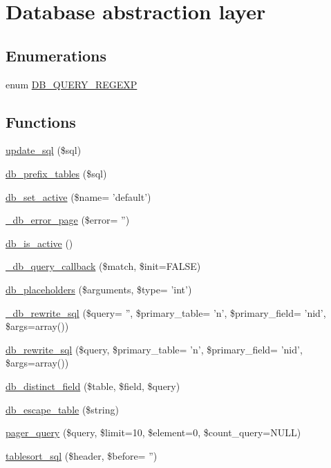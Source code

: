 \hypertarget{group__database}{
\section{Database abstraction layer}
\label{group__database}
}
\subsection*{Enumerations}
\begin{CompactItemize}
\item 
enum \hyperlink{group__database_gac2405479299ce848b4c294cdba9b046}{DB\_\-QUERY\_\-REGEXP} 
\end{CompactItemize}
\subsection*{Functions}
\begin{CompactItemize}
\item 
\hyperlink{group__database_g67680310ffaf72da52a9c2453325c0fb}{update\_\-sql} (\$sql)
\item 
\hyperlink{group__database_gdb274339376ae7e48e3ea4da4c1de0b1}{db\_\-prefix\_\-tables} (\$sql)
\item 
\hyperlink{group__database_g84e68f6dbf9cdec826e7b3852d1b283c}{db\_\-set\_\-active} (\$name= 'default')
\item 
\hyperlink{group__database_g5aab9d68ecdc1712369d5d1ef64d455c}{\_\-db\_\-error\_\-page} (\$error= '')
\item 
\hyperlink{group__database_g19eaaae8681bb72e7476ef0aa0a5d01f}{db\_\-is\_\-active} ()
\item 
\hyperlink{group__database_g337493a6287b3b48a5a2ba6d74e844bf}{\_\-db\_\-query\_\-callback} (\$match, \$init=FALSE)
\item 
\hyperlink{group__database_g8d4c967b43af1b9d9fec0466102c490c}{db\_\-placeholders} (\$arguments, \$type= 'int')
\item 
\hyperlink{group__database_g1c87af009b401cd8d695952f9eee20a9}{\_\-db\_\-rewrite\_\-sql} (\$query= '', \$primary\_\-table= 'n', \$primary\_\-field= 'nid', \$args=array())
\item 
\hyperlink{group__database_g0869f72f75d16bd0f9a52eaafa02e091}{db\_\-rewrite\_\-sql} (\$query, \$primary\_\-table= 'n', \$primary\_\-field= 'nid', \$args=array())
\item 
\hyperlink{group__database_gf07060b05ac825ab9d7bbb3ece2a699f}{db\_\-distinct\_\-field} (\$table, \$field, \$query)
\item 
\hyperlink{group__database_g5f9fd89ca517eed3dfd7f128c3d65dd1}{db\_\-escape\_\-table} (\$string)
\item 
\hyperlink{group__database_ge456e13108bb88fa7a532e1cccdeaa50}{pager\_\-query} (\$query, \$limit=10, \$element=0, \$count\_\-query=NULL)
\item 
\hyperlink{group__database_gd893ca6e60341e448203269c520696ce}{tablesort\_\-sql} (\$header, \$before= '')
\end{CompactItemize}
